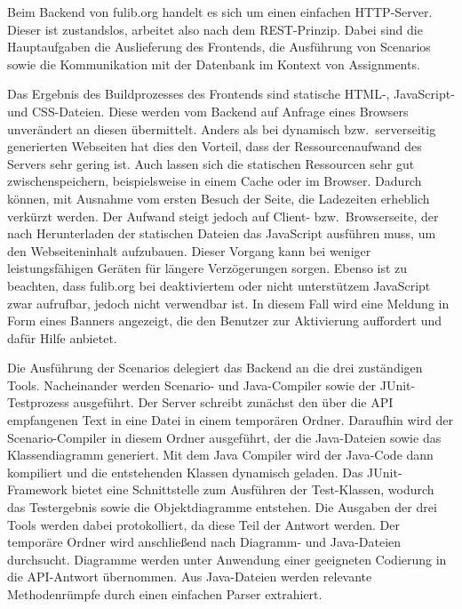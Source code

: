 Beim Backend von fulib.org handelt es sich um einen einfachen HTTP-Server.
Dieser ist zustandslos, arbeitet also nach dem REST-Prinzip.
Dabei sind die Hauptaufgaben die Auslieferung des Frontends,
die Ausführung von Scenarios
sowie die Kommunikation mit der Datenbank im Kontext von Assignments.

Das Ergebnis des Buildprozesses des Frontends sind statische HTML-, JavaScript- und CSS-Dateien.
Diese werden vom Backend auf Anfrage eines Browsers unverändert an diesen übermittelt.
Anders als bei dynamisch bzw.\ serverseitig generierten Webseiten hat dies den Vorteil,
dass der Ressourcenaufwand des Servers sehr gering ist.
Auch lassen sich die statischen Ressourcen sehr gut zwischenspeichern, beispielsweise in einem Cache oder im Browser.
Dadurch können, mit Ausnahme vom ersten Besuch der Seite, die Ladezeiten erheblich verkürzt werden.
Der Aufwand steigt jedoch auf Client- bzw.\ Browserseite,
der nach Herunterladen der statischen Dateien das JavaScript ausführen muss, um den Webseiteninhalt aufzubauen.
Dieser Vorgang kann bei weniger leistungsfähigen Geräten für längere Verzögerungen sorgen.
Ebenso ist zu beachten, dass fulib.org bei deaktiviertem oder nicht unterstützem JavaScript zwar aufrufbar, jedoch nicht verwendbar ist.
In diesem Fall wird eine Meldung in Form eines Banners angezeigt, die den Benutzer zur Aktivierung auffordert und dafür Hilfe anbietet.

Die Ausführung der Scenarios delegiert das Backend an die drei zuständigen Tools.
Nacheinander werden Scenario- und Java-Compiler sowie der JUnit-Testprozess ausgeführt.
Der Server schreibt zunächst den über die API empfangenen Text in eine Datei in einem temporären Ordner.
Daraufhin wird der Scenario-Compiler in diesem Ordner ausgeführt,
der die Java-Dateien sowie das Klassendiagramm generiert.
Mit dem Java Compiler wird der Java-Code dann kompiliert und die entstehenden Klassen dynamisch geladen.
Das JUnit-Framework bietet eine Schnittstelle zum Ausführen der Test-Klassen,
wodurch das Testergebnis sowie die Objektdiagramme entstehen.
Die Ausgaben der drei Tools werden dabei protokolliert, da diese Teil der Antwort werden.
Der temporäre Ordner wird anschließend nach Diagramm- und Java-Dateien durchsucht.
Diagramme werden unter Anwendung einer geeigneten Codierung in die API-Antwort übernommen.
Aus Java-Dateien werden relevante Methodenrümpfe durch einen einfachen Parser extrahiert.

